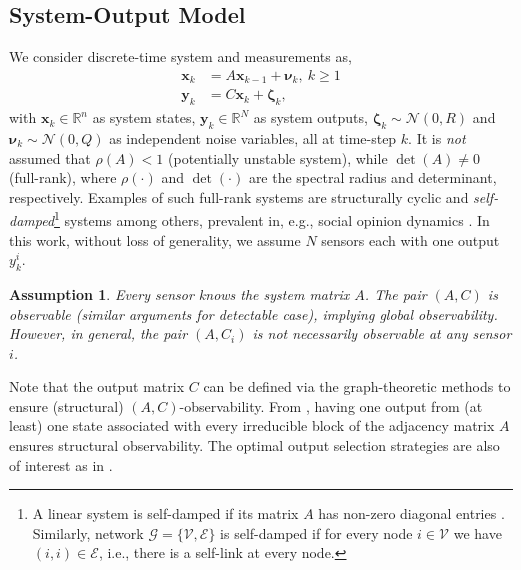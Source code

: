 \documentclass[journal]{IEEEtran}
\newtheorem{ass}{Assumption}
\def\mb{\mathbf}
\def\mc{\mathcal}
\begin{document}
\subsection{System-Output Model} \label{sec_sys} 
We consider discrete-time system and measurements as,
\begin{align}\label{eq_sys}
	\mb{x}_{k} &= A \mb{x}_{k-1} + \mb{\nu}_{k},~k\geq 1\\
	\mb{y}_{k} &= C \mb{x}_{k} + \mb{\zeta}_k, \label{eq_y}
\end{align}
with $\mb{x}_k \in \mathbb{R}^n$ as system states, $\mb{y}_k \in \mathbb{R}^N$ as system outputs, $\mb{\zeta}_k\sim\mc{N}(0,R)$ and $ \mb{\nu}_k \sim \mc{N}(0,Q)$ as independent  noise variables, all at time-step $k$. It is \textit{not} assumed that $\rho(A)<1$ (potentially unstable system), while $\det (A)\neq 0$ (full-rank), 
 where $\rho(\cdot)$ and $\det(\cdot)$  are the spectral radius and determinant, respectively. Examples of such full-rank systems are structurally cyclic \cite{tnse_selfdamp} and \textit{self-damped}\footnote{A linear system  is self-damped if its matrix $A$ has non-zero diagonal entries \cite{tnse_selfdamp,chapman2013strong}. Similarly, network $\mc{G}=\{\mc{V},\mc{E}\}$ is self-damped if for every node $i \in \mc{V}$ we have $(i,i) \in \mc{E}$, i.e., there is a self-link at every node.} systems \cite{tnse_selfdamp,chapman2013strong} among others, prevalent in, e.g., social opinion dynamics \cite{ghaderi2014opinion}.  
In this work, without loss of generality, we assume $N$ sensors each with one output ${y}_{k}^i$. 

\begin{ass} \label{ass_AC}
	Every sensor knows the system matrix $A$. The pair $(A,C)$ is observable (similar arguments for detectable case), implying \textit{global} observability. However, in general, the pair $(A,  C_i)$ is not necessarily observable at any sensor $i$. 
\end{ass}

Note that the output matrix $C$ can be defined via the graph-theoretic methods  to ensure (structural)  $(A,C)$-observability. From \cite{jstsp,pequito2015framework,lcss2020}, having one output from (at least) one state associated with every irreducible block of the adjacency matrix $A$ ensures structural observability. The optimal output selection strategies are also of interest as in \cite{ru2010sensor,tnse_selfdamp,pirani2021strategic}. 
\end{document}

